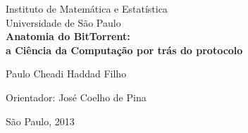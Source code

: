 \documentclass[a4paper, 11pt, oneside, brazil]{book}
\begin{document}
\thispagestyle{empty}

\frontmatter

% 


\begin{center}

	\large
		Instituto de Matemática e Estatística\\
		Universidade de São Paulo\\[-0.25cm]

	\vspace*{5.5cm}
	\textbf{\Large Anatomia do BitTorrent: \\ a Ciência da Computação por trás do protocolo}

	\vspace*{2.0cm}

	\Large{Paulo Cheadi Haddad Filho} 

	\vskip 0.6cm

	Orientador: José Coelho de Pina

	\vspace*{\fill}
	\normalsize{São Paulo, 2013}
\end{center}

\afterpage{\clearpage}





\tableofcontents

\printglossaries

\listoffigures

\begin{comment}
	\setstretch{1.5}  %
	\afterpage{\clearpage}  %

	\listofsymbols{ll}  %
	{

	}

	\setstretch{1.3}
\end{comment}
\end{document}
